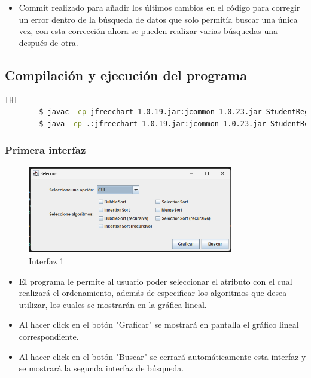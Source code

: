 \documentclass{article}
\begin{document}
    \begin{itemize}
        \item Commit realizado para añadir los últimos cambios en el código para corregir un error dentro de la búsqueda de datos que solo permitía buscar una única vez, con esta corrección ahora se pueden realizar varias búsquedas una después de otra.
    \end{itemize}

 
    \subsection{Compilación y ejecución del programa}

    \begin{lstlisting}[language=bash,caption={Compilacion y ejecución}][H]		
		$ javac -cp jfreechart-1.0.19.jar:jcommon-1.0.23.jar StudentRegistration.java Student.java
        $ java -cp .:jfreechart-1.0.19.jar:jcommon-1.0.23.jar StudentRegistration
	\end{lstlisting}

    \subsubsection{Primera interfaz}
    
     \begin{figure}[H]
        \centering
	\includegraphics[width=0.8\textwidth,keepaspectratio]{img/Interfaz1.png}
        \caption{Interfaz 1}
    \end{figure}
    
    \begin{itemize}	
        \item El programa le permite al usuario poder seleccionar el atributo con el cual realizará el ordenamiento, además de especificar los algoritmos que desea utilizar, los cuales se mostrarán en la gráfica lineal.
		\item Al hacer click en el botón "Graficar" se mostrará en pantalla el gráfico lineal correspondiente.
		\item Al hacer click en el botón "Buscar" se cerrará automáticamente esta interfaz y se mostrará la segunda interfaz de búsqueda.
	\end{itemize}
\end{document}
